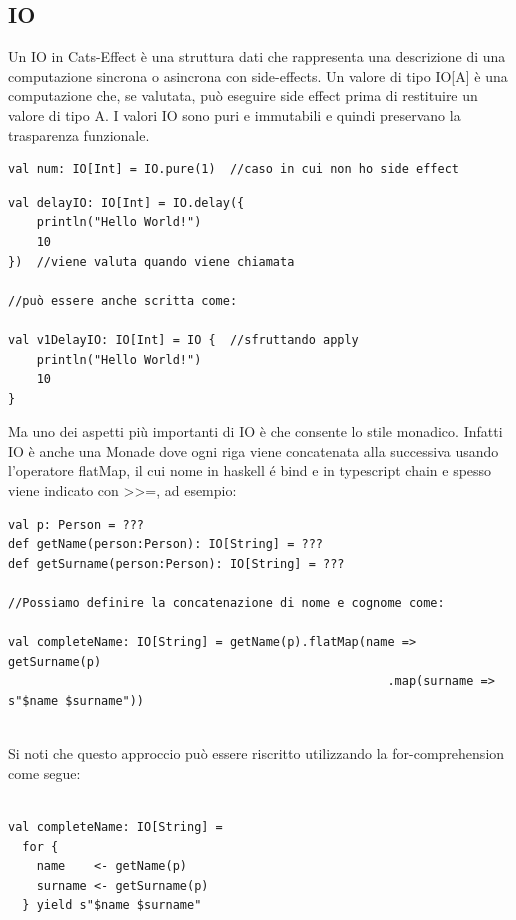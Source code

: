 \subsection{IO}
Un IO in Cats-Effect è una struttura dati che rappresenta una descrizione di una computazione sincrona o asincrona con side-effects. Un valore di tipo IO[A] è una computazione che, se valutata, può eseguire side effect prima di restituire un valore di tipo A. I valori IO sono puri e immutabili e quindi preservano la trasparenza funzionale.
\begin{verbatim}
val num: IO[Int] = IO.pure(1)  //caso in cui non ho side effect
\end{verbatim}
\begin{verbatim}
val delayIO: IO[Int] = IO.delay({ 
    println("Hello World!")
    10
})  //viene valuta quando viene chiamata

//può essere anche scritta come: 

val v1DelayIO: IO[Int] = IO {  //sfruttando apply
    println("Hello World!")
    10
} 
\end{verbatim}
Ma uno dei aspetti più importanti di IO è che consente lo stile monadico. Infatti IO è anche una Monade dove ogni riga viene concatenata alla successiva usando l'operatore flatMap, il cui nome in haskell é bind e in typescript chain e spesso viene indicato con \textgreater\textgreater=, ad esempio:

\begin{verbatim}
val p: Person = ???
def getName(person:Person): IO[String] = ???
def getSurname(person:Person): IO[String] = ???

//Possiamo definire la concatenazione di nome e cognome come:

val completeName: IO[String] = getName(p).flatMap(name => getSurname(p)
                                                     .map(surname => s"$name $surname"))
    
\end{verbatim}

\noindent Si noti che questo approccio può essere riscritto utilizzando la for-comprehension come segue:
\begin{verbatim}

val completeName: IO[String] = 
  for {
    name    <- getName(p)
    surname <- getSurname(p)
  } yield s"$name $surname"
    
\end{verbatim}


